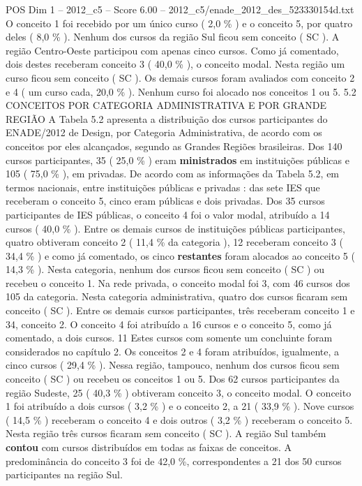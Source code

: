 \begin{textsample}{POS Dim 1 – 2012\_c5 – Score 6.00 – 2012\_c5/enade\_2012\_des\_523330154d.txt}
O conceito 1 foi recebido por um único curso ( 2,0 \% ) e o conceito 5, por quatro deles ( 8,0 \% ).
Nenhum dos cursos da região Sul ficou sem conceito ( SC ).
A região Centro-Oeste participou com apenas cinco cursos.
Como já comentado, dois destes receberam conceito 3 ( 40,0 \% ), o conceito modal.
Nesta região um curso ficou sem conceito ( SC ).
Os demais cursos foram avaliados com conceito 2 e 4 ( um curso cada, 20,0 \% ).
Nenhum curso foi alocado nos conceitos 1 ou 5. 5.2 CONCEITOS POR CATEGORIA ADMINISTRATIVA E POR GRANDE REGIÃO A Tabela 5.2 apresenta a distribuição dos cursos participantes do ENADE/2012 de Design, por Categoria Administrativa, de acordo com os conceitos por eles alcançados, segundo as Grandes Regiões brasileiras.
Dos 140 cursos participantes, 35 ( 25,0 \% ) eram \textbf{ministrados} em instituições públicas e 105 ( 75,0 \% ), em privadas.
De acordo com as informações da Tabela 5.2, em termos nacionais, entre instituições públicas e privadas : das sete IES que receberam o conceito 5, cinco eram públicas e dois privadas.
Dos 35 cursos participantes de IES públicas, o conceito 4 foi o valor modal, atribuído a 14 cursos ( 40,0 \% ).
Entre os demais cursos de instituições públicas participantes, quatro obtiveram conceito 2 ( 11,4 \% da categoria ), 12 receberam conceito 3 ( 34,4 \% ) e como já comentado, os cinco \textbf{restantes} foram alocados ao conceito 5 ( 14,3 \% ).
Nesta categoria, nenhum dos cursos ficou sem conceito ( SC ) ou recebeu o conceito 1.
Na rede privada, o conceito modal foi 3, com 46 cursos dos 105 da categoria.
Nesta categoria administrativa, quatro dos cursos ficaram sem conceito ( SC ).
Entre os demais cursos participantes, três receberam conceito 1 e 34, conceito 2.
O conceito 4 foi atribuído a 16 cursos e o conceito 5, como já comentado, a dois cursos. 11 Estes cursos com somente um concluinte foram considerados no capítulo 2.
Os conceitos 2 e 4 foram atribuídos, igualmente, a cinco cursos ( 29,4 \% ).
Nessa região, tampouco, nenhum dos cursos ficou sem conceito ( SC ) ou recebeu os conceitos 1 ou 5.
Dos 62 cursos participantes da região Sudeste, 25 ( 40,3 \% ) obtiveram conceito 3, o conceito modal.
O conceito 1 foi atribuído a dois cursos ( 3,2 \% ) e o conceito 2, a 21 ( 33,9 \% ).
Nove cursos ( 14,5 \% ) receberam o conceito 4 e dois outros ( 3,2 \% ) receberam o conceito 5.
Nesta região três cursos ficaram sem conceito ( SC ).
A região Sul também \textbf{contou} com cursos distribuídos em todas as faixas de conceitos.
A predominância do conceito 3 foi de 42,0 \%, correspondentes a 21 dos 50 cursos participantes na região Sul.

\end{textsample}
